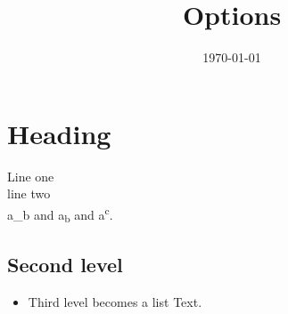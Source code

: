 \documentclass[11pt]{article}
\date{\today}
\title{Options}
\begin{document}
\maketitle
\section*{ Heading}
\label{sec:org47118c0}
Line one\\
line two\\
a\_b and a\textsubscript{b} and a\textsuperscript{c}.\\
\subsection*{Second level}
\label{sec:orgaf3ed89}
\begin{itemize}
\item Third level becomes a list
\label{sec:org1c59b52}
Text.\\
\end{itemize}
\end{document}
